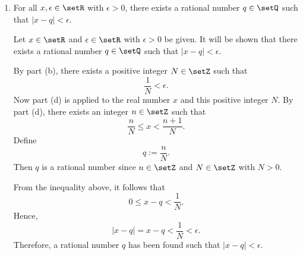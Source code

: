 \begin{enumerate}
\begin{enumerate}
\begin{subprove}
      Consider the real number $Nx$.
      By part (c), applied to $Nx$, there exists an integer $k \in \setZ$ such that
      \[
        k \leq Nx < k + 1.
      \]
      Define $n := k$.
      Then $n \in \setZ$, and dividing the inequality by $N > 0$ gives
      \[
        \frac{n}{N} \leq x < \frac{n+1}{N}.
      \]
      Thus, such an integer $n$ exists for the given $x$ and $N$.
    \end{subprove}
    
    \item For all $x, \epsilon \in \setR$ with $\epsilon>0$, there exists a rational number $q \in \setQ$ such that $|x-q|<\epsilon$.
    \begin{subprove}
      Let $x \in \setR$ and $\epsilon \in \setR$ with $\epsilon > 0$ be given.
      It will be shown that there exists a rational number $q \in \setQ$ such that $|x - q| < \epsilon$.
    
      By part (b), there exists a positive integer $N \in \setZ$ such that
      \[
        \frac{1}{N} < \epsilon.
      \]
      Now part (d) is applied to the real number $x$ and this positive integer $N$.
      By part (d), there exists an integer $n \in \setZ$ such that
      \[
        \frac{n}{N} \leq x < \frac{n+1}{N}.
      \]
      Define
      \[
        q := \frac{n}{N}.
      \]
      Then $q$ is a rational number since $n \in \setZ$ and $N \in \setZ$ with $N > 0$.
    
      From the inequality above, it follows that
      \[
        0 \leq x - q < \frac{1}{N}.
      \]
      Hence,
      \[
        |x - q| = x - q < \frac{1}{N} < \epsilon.
      \]
      Therefore, a rational number $q$ has been found such that $|x - q| < \epsilon$.
    \end{subprove}
    
  \end{enumerate}


\end{enumerate}






































